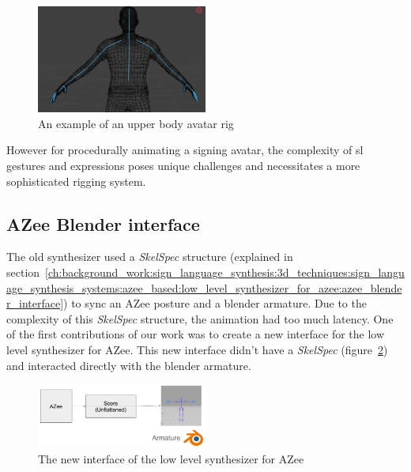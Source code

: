 \documentclass[../../main.tex]{subfiles}
\begin{document}
\begin{figure}[h]
    \centering
    \includegraphics[width=0.5\textwidth]{chapters/avatar_creation_pose_synthesis/images/upper_body_avatar.png}
    \caption{An example of an upper body avatar rig}
    \label{fig:upper_body_avatar}
\end{figure}

However for procedurally animating a signing avatar, the complexity of \gls{sl} gestures and expressions poses unique challenges and necessitates a more sophisticated rigging system.

\subsection{AZee Blender interface}
\label{ch:avatar_creation_pose_synthesis:proc_rig_signing_avatars:azee_blender_interface}

The old synthesizer used a \emph{SkelSpec} structure (explained in section~\ref{ch:background_work:sign_language_synthesis:3d_techniques:sign_language_synthesis_systems:azee_based:low_level_synthesizer_for_azee:azee_blender_interface}) to sync an AZee posture and a blender armature. Due to the complexity of this \emph{SkelSpec} structure, the animation had too much latency. One of the first contributions of our work was to create a new interface for the low level synthesizer for AZee. This new interface didn't have a \emph{SkelSpec} (figure~\ref{fig:new_interface}) and interacted directly with the blender armature. 

\begin{figure}
    \centering
    \includegraphics[width=0.5\textwidth]{chapters/avatar_creation_pose_synthesis/images/new_interface.png}
    \caption{The new interface of the low level synthesizer for AZee}
    \label{fig:new_interface}
\end{figure}
\end{document}
